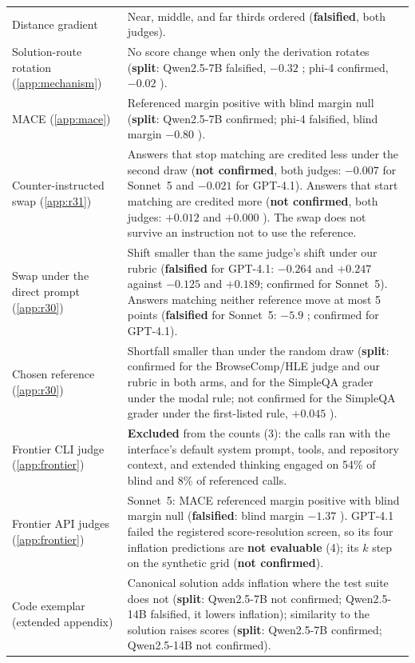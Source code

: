 {\begin{longtable}{L{3.5cm}L{9.5cm}}
Distance gradient & Near, middle, and far thirds ordered (\textbf{falsified}, both judges). \\
Solution-route rotation (\cref{app:mechanism}) & No score change when only the derivation rotates (\textbf{split}: Qwen2.5-7B falsified, $-0.32$ ; phi-4 confirmed, $-0.02$ ). \\
\textsc{MACE} (\cref{app:mace}) & Referenced margin positive with blind margin null (\textbf{split}: Qwen2.5-7B confirmed; phi-4 falsified, blind margin $-0.80$ ). \\
Counter-instructed swap (\cref{app:r31}) & Answers that stop matching are credited less under the second draw (\textbf{not confirmed}, both judges: $-0.007$  for Sonnet~5 and $-0.021$  for GPT-4.1). Answers that start matching are credited more (\textbf{not confirmed}, both judges: $+0.012$  and $+0.000$ ). The swap does not survive an instruction not to use the reference. \\
Swap under the direct prompt (\cref{app:r30}) & Shift smaller than the same judge's shift under our rubric (\textbf{falsified} for GPT-4.1: $-0.264$ and $+0.247$ against $-0.125$ and $+0.189$; confirmed for Sonnet~5). Answers matching neither reference move at most 5 points (\textbf{falsified} for Sonnet~5: $-5.9$ ; confirmed for GPT-4.1). \\
Chosen reference (\cref{app:r30}) & Shortfall smaller than under the random draw (\textbf{split}: confirmed for the BrowseComp/HLE judge and our rubric in both arms, and for the SimpleQA grader under the modal rule; not confirmed for the SimpleQA grader under the first-listed rule, $+0.045$ ). \\
Frontier CLI judge (\cref{app:frontier}) & \textbf{Excluded} from the counts (3): the calls ran with the interface's default system prompt, tools, and repository context, and extended thinking engaged on 54\% of blind and 8\% of referenced calls. \\
Frontier API judges (\cref{app:frontier}) & Sonnet~5: \textsc{MACE} referenced margin positive with blind margin null (\textbf{falsified}: blind margin $-1.37$ ). GPT-4.1 failed the registered score-resolution screen, so its four inflation predictions are \textbf{not evaluable} (4); its $k$ step on the synthetic grid (\textbf{not confirmed}). \\
Code exemplar (extended appendix) & Canonical solution adds inflation where the test suite does not (\textbf{split}: Qwen2.5-7B not confirmed; Qwen2.5-14B falsified, it lowers inflation); similarity to the solution raises scores (\textbf{split}: Qwen2.5-7B confirmed; Qwen2.5-14B not confirmed). \\

\end{longtable}}
